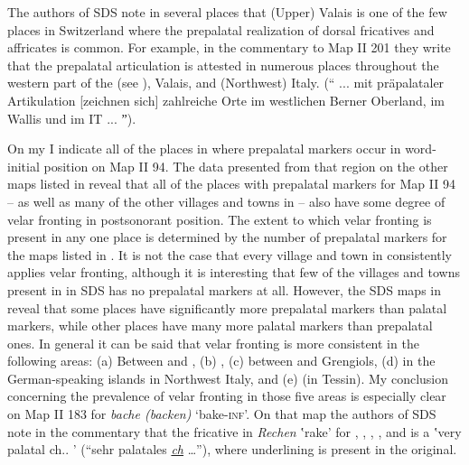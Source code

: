 {The authors of SDS note in several places that (Upper) Valais is one of the few places in Switzerland where the prepalatal realization of dorsal fricatives and affricates is common. For example, in the commentary to Map II 201 they write that the prepalatal articulation is attested in numerous places throughout the western part of the  (see ), Valais, and (Northwest) Italy. (“ ... mit präpalataler Artikulation [zeichnen sich] zahlreiche Orte im westlichen Berner Oberland, im Wallis und im IT ... ˮ).\largerpage[-1]

On my  I indicate all of the places in  where prepalatal markers occur in word-initial position on Map II 94. The data presented from that region on the other maps listed in  reveal that all of the places with prepalatal markers for Map II 94 -- as well as many of the other villages and towns in  -- also have some degree of velar fronting in postsonorant position. The extent to which velar fronting is present in any one place is determined by the number of prepalatal markers for the maps listed in . It is not the case that every village and town in  consistently applies velar fronting, although it is interesting that few of the villages and towns present in  in SDS has no prepalatal markers at all. However, the SDS maps in  reveal that some places have significantly more prepalatal markers than palatal markers, while other places have many more palatal markers than prepalatal ones. In general it can be said that velar fronting is more consistent in the following areas: (a) Between  and , (b) , (c) between  and Grengiols, (d) in the German-speaking islands in Northwest Italy, and (e)  (in Tessin). My conclusion concerning the prevalence of velar fronting in those five areas is especially clear on Map II 183 for \textit{bache (backen)} ‘bake-\textsc{inf}’. On that map the authors of SDS note in the commentary that the fricative in \textit{Rechen} ʽrake’ for , , , , and  is a ʽvery palatal ch.. ’ (“sehr palatales \ul{\textit{ch}} …”), where underlining is present in the original.

}
